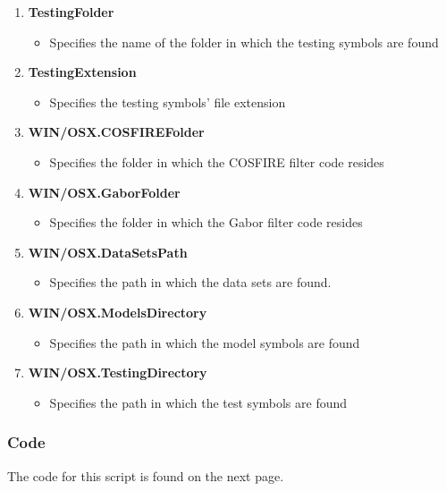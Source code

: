 \begin{enumerate}
\begin{itemize}
    \end{itemize}
\item {\bf TestingFolder}
    \begin{itemize}
        \item Specifies the name of the folder in which the testing symbols are found
    \end{itemize}
\item {\bf TestingExtension}
    \begin{itemize}
        \item Specifies the testing symbols' file extension
    \end{itemize}
\item {\bf WIN/OSX.COSFIREFolder}
    \begin{itemize}
        \item Specifies the folder in which the COSFIRE filter code resides
    \end{itemize}
\item {\bf WIN/OSX.GaborFolder}  
    \begin{itemize}
        \item Specifies the folder in which the Gabor filter code resides
    \end{itemize}   
\item {\bf WIN/OSX.DataSetsPath}
    \begin{itemize}
        \item Specifies the path in which the data sets are found.
    \end{itemize}
\item {\bf WIN/OSX.ModelsDirectory}
    \begin{itemize}
        \item Specifies the path in which the model symbols are found
    \end{itemize}
\item {\bf WIN/OSX.TestingDirectory}
    \begin{itemize}
        \item Specifies the path in which the test symbols are found
    \end{itemize}
\end{enumerate}
\subsubsection{Code}
The code for this script is found on the next page.
\vspace{120.55mm}



